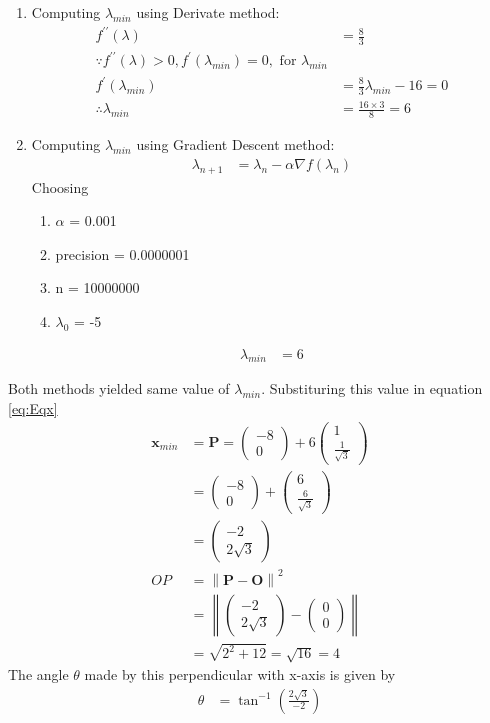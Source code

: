 \documentclass[12pt]{article}
\providecommand{\brak}[1]{\ensuremath{\left(#1\right)}}
\providecommand{\norm}[1]{\left\lVert#1\right\rVert}
\newcommand{\myvec}[1]{\ensuremath{\begin{pmatrix}#1\end{pmatrix}}}
\let\vec\mathbf
\begin{document}
\begin{enumerate}
\begin{enumerate}
\item Computing $\lambda_{min}$ using Derivate method:
\begin{align}
	f^{\prime\prime}\brak{\lambda} &= \frac{8}{3} \\
	\because f^{\prime\prime}\brak{\lambda} > 0, f^\prime\brak{\lambda_{min}} = 0, \text{ for } \lambda_{min} \\ 
	f^\prime\brak{\lambda_{min}} &= \frac{8}{3}\lambda_{min} - 16  = 0\\
	\therefore \lambda_{min} &= \frac{16 \times 3}{8}  = 6
\end{align}
\item Computing $\lambda_{min}$ using Gradient Descent method:
\begin{align}
	\label{eq:grad_des}
	\lambda_{n+1} &= \lambda_n - \alpha \nabla f\brak{\lambda_n}
\end{align}
Choosing
\begin{enumerate}
 \item $\alpha$ = 0.001
 \item precision = 0.0000001
 \item n = 10000000 
 \item $\lambda_0$ = -5 
\end{enumerate}
\begin{align}
	\lambda_{min} &= 6 
\end{align}
\end{enumerate}
Both methods yielded same value of $\lambda_{min}$. Substituring this value in equation \eqref{eq:Eqx}
\begin{align}
	\vec{x}_{min} &= \vec{P} = \myvec{-8 \\ 0}+6\myvec{1 \\ \frac{1}{\sqrt{3}}}  \\
	&= \myvec{-8 \\ 0}+\myvec{6 \\ \frac{6}{\sqrt{3}}} \\
	&= \myvec{-2 \\ 2\sqrt{3}} \\
	OP &= \norm{\vec{P}-\vec{O}}^2 \\ 
	&= \norm{\myvec{-2 \\ 2\sqrt{3}}-\myvec{0 \\ 0}} \\
	&= \sqrt{2^2 + 12} = \sqrt{16} = 4
\end{align}
The angle $\theta$ made by this perpendicular with x-axis is given by
\begin{align}
         \theta &= \tan^{-1}\brak{\frac{2\sqrt{3}}{-2}} \\

\end{align}
\end{enumerate}
\end{document}
